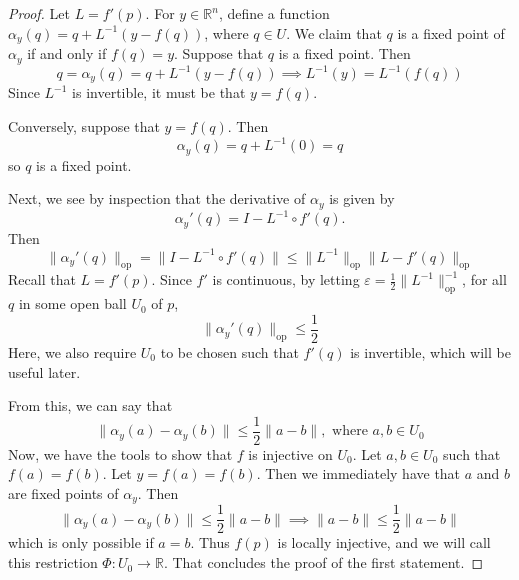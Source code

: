 \documentclass{article}
\newcommand{\op}{\mathrm{op}}
\theoremstyle{plain} %
\numberwithin{thm}{section} %
\theoremstyle{definition}
\begin{document}
    \begin{proof}
        Let \(L = f'(p)\). For \(y \in \mathbb{R}^n\), define a function \(\alpha_y (q) = q + L^{-1}(y - f(q))\), where \(q \in U\). We claim that \(q\) is a fixed point of \(\alpha _y\) if and only if \(f(q) = y\). Suppose that \(q\) is a fixed point. Then
        \[
            q = \alpha _y (q) = q + L^{-1} (y - f(q)) \implies L^{-1} (y) = L^{-1} (f(q))
        \]
        Since \(L^{-1}\) is invertible, it must be that \(y = f(q)\).

        Conversely, suppose that \(y = f(q)\). Then
        \[
            \alpha _y(q) = q + L^{-1} (0) = q
        \]
        so \(q\) is a fixed point.

        Next, we see by inspection that the derivative of \(\alpha _y\) is given by
        \[
            \alpha _y'(q) = I - L^{-1} \circ f'(q).
        \]
        Then
        \[
            \|\alpha _y'(q)\| _{\op} = \|I - L^{-1} \circ f'(q)\| \leq \|L^{-1} \| _{\op} \|L - f'(q)\| _{\op}
        \]
        Recall that \(L = f'(p)\). Since \(f'\) is continuous, by letting \(\varepsilon = \frac{1}{2}\|L^{-1} \| _{\op}^{-1}\), for all \(q\) in some open ball \(U_0\) of \(p\), 
        \[
            \|\alpha _y'(q)\| _{\op} \leq \frac{1}{2}
        \]
        Here, we also require \(U_0\) to be chosen such that \(f'(q)\) is invertible, which will be useful later.

        From this, we can say that
        \[
            \|\alpha _y(a) - \alpha _y(b)\| \leq \frac{1}{2}\|a - b\|, \text{ where } a,b \in U_0
        \]
        Now, we have the tools to show that \(f\) is injective on \(U_0\). Let \(a,b \in U_0\) such that \(f(a) = f(b)\). Let \(y = f(a) = f(b)\). Then we immediately have that \(a\) and \(b\) are fixed points of \(\alpha_y\). Then
        \[
            \|\alpha _y(a) - \alpha _y(b)\| \leq \frac{1}{2}\|a - b\| \implies \|a - b\| \leq \frac{1}{2}\|a - b\|
        \]
        which is only possible if \(a = b\). Thus \(f(p)\) is locally injective, and we will call this restriction \(\Phi: U_0 \to \mathbb{R}\). That concludes the proof of the first statement.


\end{proof}
\end{document}

